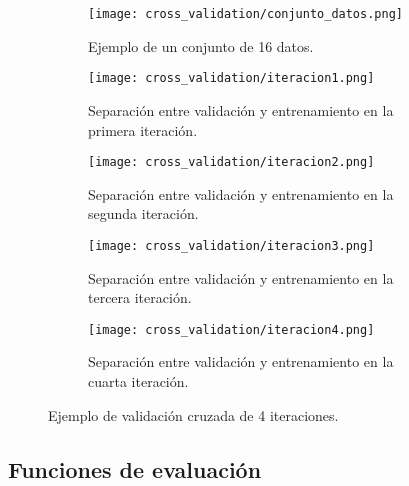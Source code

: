 \begin{figure}[H]
    \centering

	 \begin{subfigure}[b]{\textwidth}
		\centering
		\texttt{[image: cross\_validation/conjunto\_datos.png]}
		\caption{Ejemplo de un conjunto de 16 datos.}
	  \label{fig:ej_16_datos}
   \end{subfigure}
	\vspace{1cm}

	 \begin{subfigure}[b]{\textwidth}
		 \centering
		 \texttt{[image: cross\_validation/iteracion1.png]}
 		 \caption{Separación entre validación y entrenamiento en la primera iteración.}
 	    \label{fig:cv_iteracion1}
	 \end{subfigure}
	 \vspace{1cm}

	\begin{subfigure}[b]{\textwidth}
		 \centering
		 \texttt{[image: cross\_validation/iteracion2.png]}
 		 \caption{Separación entre validación y entrenamiento en la segunda iteración.}
 	    \label{fig:cv_iteracion2}
   \end{subfigure}
	\vspace{1cm}

	\begin{subfigure}[b]{\textwidth}
		 \centering
		 \texttt{[image: cross\_validation/iteracion3.png]}
 		 \caption{Separación entre validación y entrenamiento en la tercera iteración.}
 	    \label{fig:cv_iteracion3}
	\end{subfigure}
	\vspace{1cm}

	\begin{subfigure}[b]{\textwidth}
		 \centering
		 \texttt{[image: cross\_validation/iteracion4.png]}
 		 \caption{Separación entre validación y entrenamiento en la cuarta iteración.}
 	    \label{fig:cv_iteracion4}
	\end{subfigure}

	\caption{Ejemplo de validación cruzada de 4 iteraciones.}
	\label{fig:4-cv-ejemplo}
\end{figure}





\newpage

\subsection{Funciones de evaluación}


